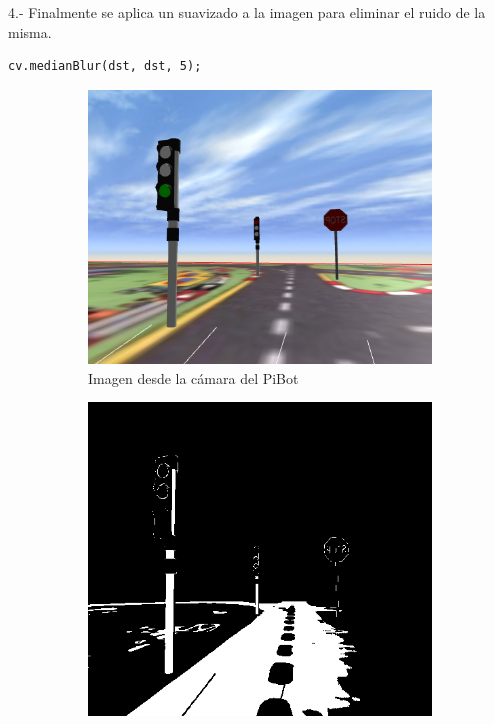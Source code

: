 \documentclass{report}
\begin{document}
4.- Finalmente se aplica un suavizado a la imagen para eliminar el ruido de la misma.

\begin{lstlisting}[backgroundcolor = \color{light-gray},
				   aboveskip = 2em,
				   belowskip = 2em,
                   xleftmargin = 2cm,
                   framexleftmargin = 1em,
                   basicstyle=\small]
cv.medianBlur(dst, dst, 5);
\end{lstlisting}

\begin{figure}[h]
\begin{subfigure}{.5\textwidth}
  \centering
  \includegraphics[width=.7\linewidth, height=.65\linewidth]{images/cap4/camara-pibot.png}  
  \caption{Imagen desde la cámara del PiBot}
  \label{fig:sub-first}
\end{subfigure}
\begin{subfigure}{.5\textwidth}
  \centering
  \includegraphics[width=.7\linewidth]{images/cap4/filtro-color.png}  

\end{subfigure}
\end{figure}
\end{document}
